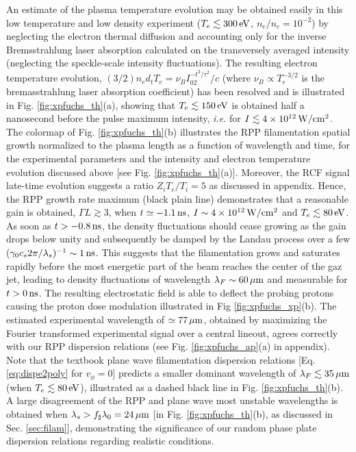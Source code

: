 \documentclass[
 reprint,
 amsmath,amssymb,
 aps,
]{revtex4-1}
\begin{document}
An estimate of the plasma temperature evolution may be obtained easily in this low temperature and low density experiment ($T_e\lesssim 300 \,\rm eV$, $n_e/n_c=10^{-2}$) by neglecting the electron thermal diffusion and accounting only for the inverse Bremsstrahlung laser absorption calculated on the transversely averaged intensity (neglecting the speckle-scale intensity fluctuations). The resulting electron temperature evolution, \mbox{$(3/2)n_e d_tT_e=\nu_BI_02^{-t^2/\tau^2}/c$} (where $\nu_B\propto T_e^{-3/2}$ is  the bremasstrahlung laser absorption coefficient) has been resolved and is illustrated in Fig. \ref{fig:xpfuchs_th}(a), showing that  $T_e\lesssim 150\, \rm eV $ is obtained half a nanosecond before the pulse maximum intensity, \emph{i.e.} for $I\lesssim 4\times 10^{12}\, \rm W/cm^2$. 
The colormap of Fig. \ref{fig:xpfuchs_th}(b) illustrates the RPP filamentation spatial  growth normalized to the plasma length  as a function of   wavelength and  time, for the experimental parameters and the  intensity and electron temperature evolution discussed above [see Fig. \ref{fig:xpfuchs_th}(a)].
Moreover, the RCF signal late-time evolution suggests a ratio  $Z_iT_e/T_i=5$ as discussed in appendix. Hence, the RPP growth rate maximum (black plain line) demonstrates that a reasonable gain is obtained,  $\Gamma L\gtrsim 3$, when $t\simeq -1.1\,\rm ns$, $I\sim 4\times 10^{12}\,\rm W/cm^2$ and  $T_e\lesssim 80\, \rm eV$.
As soon as $t>-0.8\, \rm ns$, the density fluctuations should cease growing as the gain drops below unity  and subsequently be damped by the Landau process over a few ($\gamma_0c_s2\pi/\lambda_s)^{-1} \sim 1\, \rm ns$.
This suggests that the filamentation grows and saturates rapidly before the most energetic part of the beam reaches the center of the gaz jet, leading to  density fluctuations of wavelength   $\lambda_F \sim 60 \,\rm\mu m$ and measurable for $t>0\,\rm ns$. The resulting electrostatic field is able to deflect the probing protons   causing the proton dose modulation illustrated in Fig \ref{fig:xpfuchs_xp}(b). 
The estimated experimental wavelength of $\simeq 77 \,\rm\mu m$, obtained by maximizing the Fourier transformed experimental signal over a central lineout, agrees correctly with our RPP dispersion relations (see Fig. \ref{fig:xpfuchs_ap}(a)  in appendix). 
Note that the textbook plane wave filamentation dispersion relations [Eq. \eqref{eq:dispe2poly} for $v_\phi=0$] predicts a  smaller dominant wavelength of $ \lambda_F\lesssim  35\, \rm\mu m$ (when $T_e\lesssim80\, \rm eV$), illustrated as a dashed black line in Fig. \ref{fig:xpfuchs_th}(b). A large disagreement of the  RPP and plane wave most unstable wavelengths is obtained when  $\lambda_s> f_\sharp\lambda_0=24\,\rm\mu m$ [in Fig. \ref{fig:xpfuchs_th}(b), as discussed in Sec. \ref{sec:filam}], demonstrating the significance of our random phase plate dispersion relations regarding realistic conditions.
\end{document}
